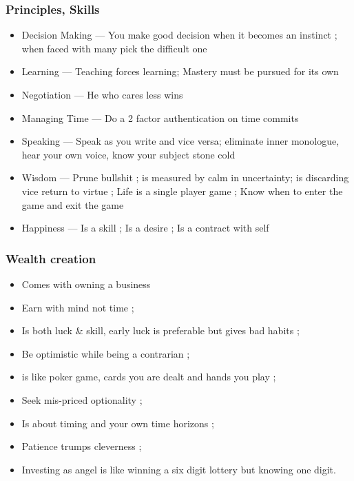 \begin{frame}[fragile]\frametitle{Principles, Skills}

\begin{itemize}
\item Decision Making — You make good decision when it becomes an instinct ; when
faced with many pick the difficult one
\item Learning — Teaching forces learning; Mastery must be pursued for its own
\item Negotiation — He who cares less wins
\item Managing Time — Do a 2 factor authentication on time commits
\item Speaking — Speak as you write and vice versa; eliminate inner monologue, hear your
own voice, know your subject stone cold
\item Wisdom — Prune bullshit ; is measured by calm in uncertainty; is discarding vice
return to virtue ; Life is a single player game ; Know when to enter the game and exit
the game
\item Happiness — Is a skill ; Is a desire ; Is a contract with self
\end{itemize}

\end{frame}


\begin{frame}[fragile]\frametitle{ Wealth creation}

\begin{itemize}
\item Comes with owning a business
\item Earn with mind not time ;
\item Is both luck & skill, early luck is preferable but gives bad habits ;
\item Be optimistic while being a contrarian ;
\item is like poker game, cards you are dealt and hands you play ;
\item Seek mis-priced optionality ;
\item Is about timing and your own time horizons ;
\item Patience trumps cleverness ;
\item Investing as angel is like winning a six digit lottery but knowing one digit.
\end{itemize}

\end{frame}

